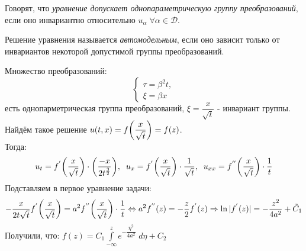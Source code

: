 \documentclass[../main.tex]{subfiles}
\begin{document}
\begin{definition}
	Говорят, что \textit{уравнение допускает однопараметрическую группу преобразований}, если оно инвариантно относительно $u_{\alpha}\; \forall \alpha \in \mathcal{D}$.
\end{definition}
\begin{definition}
Решение уравнения называется \textit{автомодельным}, если оно зависит только от инвариантов некоторой допустимой группы преобразований.
\end{definition}
Множество преобразований:
\begin{equation*}
\begin{cases}
	\tau = \beta^2 t, \\
	\xi = \beta x
\end{cases}
\end{equation*}
есть однопарметрическая группа преобразований, $\xi = \dfrac{x}{\sqrt{t}} $ - инвариант группы. \\
Найдём такое решение $u(t, x) = f\biggl(\dfrac{x}{\sqrt{t}}\biggr) = f(z)$. \\
Тогда:
\begin{equation*}
	u_t = f^{'}\biggl(\dfrac{x}{\sqrt{t}}\biggr) \cdot \biggl(\dfrac{-x}{2t^{\frac{3}{2}}}\biggr), \; \; u_x = f^{'}\biggl(\dfrac{x}{\sqrt{t}}\biggr) \cdot \dfrac{1}{\sqrt{t}},\; \; u_{xx} = f^{''}\biggl(\dfrac{x}{\sqrt{t}}\biggr) \cdot \dfrac{1}{t}
\end{equation*}
Подставляем в первое уравнение задачи:
\begin{equation*}
	-\dfrac{x}{2t\sqrt{t}} f^{'}\biggl(\dfrac{x}{\sqrt{t}}\biggr) = a^2 f^{''}\biggl(\dfrac{x}{\sqrt{t}}\biggr) \cdot \dfrac{1}{t} \Leftrightarrow a^2f^{''}(z) = -\dfrac{z}{2}f^{'}(z) \Rightarrow \ln|f^{'}(z)| = -\dfrac{z^2}{4a^2} + \tilde{C}_1
\end{equation*}
Получили, что: $f(z) = C_1 \displaystyle\int\limits_{-\infty}^z e^{-\dfrac{\eta^2}{4a^2}}\;d\eta + C_2$
\end{document}
